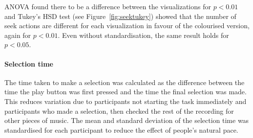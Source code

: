 ANOVA found there to be a difference between the visualizations for $p < 0.01$ and Tukey's HSD test (see
Figure~\ref{fig:seektukey}) showed that the number of seek actions are different for each visualization in favour of
the colourised version, again for $p < 0.01$. Even without standardisation, the same result holds for $p < 0.05$.


\paragraph{Selection time}
The time taken to make a selection was calculated as the difference between the time the play button was first pressed
and the time the final selection was made. This reduces variation due to participants not starting the task immediately
and participants who made a selection, then checked the rest of the recording for other pieces of music. The mean and
standard deviation of the selection time was standardised for each participant to reduce the effect of people's natural
pace.


